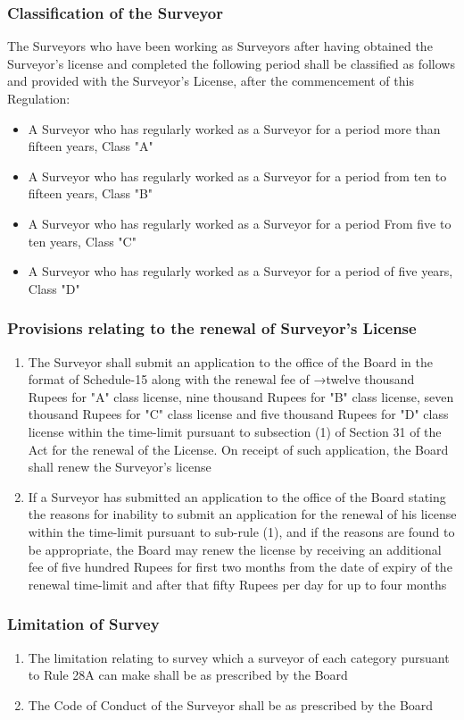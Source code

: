 \subsubsection{Classification of the Surveyor}
The Surveyors who have been working as Surveyors after having obtained the Surveyor's license and completed the following period shall be classified as follows and provided with the Surveyor's License, after the commencement of this Regulation:
\begin{itemize}
	\item  A Surveyor who has regularly worked as a Surveyor for a period more than fifteen years, Class "A"
	\item A Surveyor who has regularly worked as a Surveyor for a period from ten to fifteen years, Class "B"
	\item A Surveyor who has regularly worked as a Surveyor for a period From five to ten years, Class "C"
	\item A Surveyor who has regularly worked as a Surveyor for a period of five years, Class "D"
\end{itemize}
%
\subsubsection{Provisions relating to the renewal of Surveyor's License}
\begin{enumerate}
	\item The Surveyor shall submit an application to the office of the Board in the format of Schedule-15 along with the renewal fee of →twelve thousand Rupees for "A" class license, nine thousand Rupees for "B" class license, seven thousand Rupees for "C" class license
	and five thousand Rupees for "D" class license within the time-limit pursuant to subsection (1) of Section 31 of the Act for the renewal of the License. On receipt of such application, the Board shall renew the Surveyor's license
	\item If a Surveyor has submitted an application to the office of the Board stating the reasons for
	inability to submit an application for the renewal of his license within the time-limit pursuant to sub-rule (1), and if the reasons are found to be appropriate, the Board may renew the license by receiving an additional fee of five hundred Rupees for first two months from the date of expiry of the renewal time-limit and after that fifty Rupees per day for up to four months
\end{enumerate}
%
\subsubsection{Limitation of Survey}
\begin{enumerate}
	\item The limitation relating to survey which a surveyor of each category pursuant to Rule 28A can make shall be as prescribed by the Board
	\item The Code of Conduct of the Surveyor shall be as prescribed by the Board
\end{enumerate}
%
